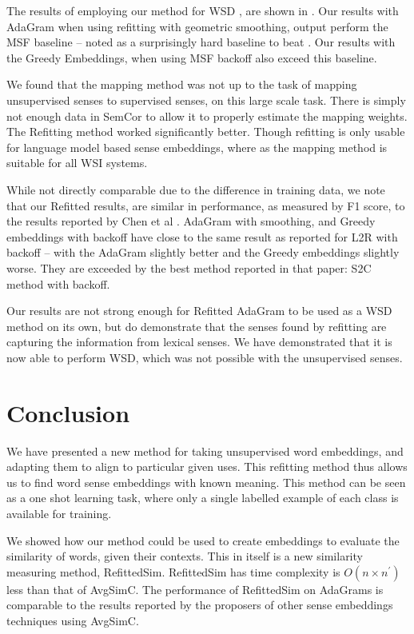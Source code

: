 \documentclass{sig-alternate}
\begin{document}
The results of employing our method for WSD , are shown in . Our results with AdaGram when using refitting with geometric smoothing, output perform the MSF baseline -- noted as a surprisingly hard baseline to beat \parencite{Chen2014}. Our results with the Greedy Embeddings, when using MSF backoff also exceed this baseline.

We found that the mapping method\parencite{agirre2006}  was not up to the task of mapping unsupervised senses to supervised senses, on this large scale task. There is simply not enough data in SemCor to allow it to properly estimate the mapping weights. The Refitting method worked significantly better. Though refitting is only usable for language model based sense embeddings, where as the mapping method is suitable for all WSI systems.

While not directly comparable due to the difference in training data, we note that our Refitted results, are similar in performance, as measured by F1 score, to the results reported by Chen et al \parencite{Chen2014}.
AdaGram with smoothing, and Greedy embeddings with backoff have close to the same result as reported for L2R with backoff -- with the AdaGram slightly better and the Greedy embeddings slightly worse. They are exceeded by the best method reported in that paper: S2C method with backoff.

Our results are not strong enough for Refitted AdaGram to be used as a WSD method on its own, but do demonstrate that the senses found by refitting are capturing the information from lexical senses. We have demonstrated that it is now able to perform WSD, which was not possible with the unsupervised senses. 

\section{Conclusion}\label{conclusion}

We have presented a new method for taking unsupervised word embeddings, and adapting them to align to particular given uses. This refitting method thus allows us to find word sense embeddings with known meaning. This method can be seen as a one shot learning task, where only a single labelled example of each class is available for training.

We showed how our method could be used to create embeddings to evaluate the similarity of words, given their contexts. This in itself is a new similarity measuring method, RefittedSim.  RefittedSim has time complexity is $O(n \times n^\prime)$ less than that of AvgSimC. The performance of RefittedSim on AdaGrams is comparable to the results reported by the proposers of other sense embeddings techniques using AvgSimC.
\end{document}

